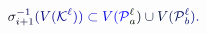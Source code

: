 \documentclass[12pt]{article}
\begin{document}
\makeatletter
\renewcommand*{\@textcolor}[3]{%
  \protect\leavevmode
  \begingroup
    \color#1{#2}#3%
  \endgroup
}
\makeatother
\begin{displaymath}
\mathcolor[RGB]{0,0,15}{\sigma} _ { \mathcolor[RGB]{0,0,30}{i} \mathcolor[RGB]{0,0,45}{+} \mathcolor[RGB]{0,0,60}{1} } ^ { \mathcolor[RGB]{0,0,75}{-} \mathcolor[RGB]{0,0,90}{1} } \mathcolor[RGB]{0,0,105}{(} \mathcolor[RGB]{0,0,120}{V} \mathcolor[RGB]{0,0,135}{(} \mathcal { \mathcolor[RGB]{0,0,150}{K} } ^ { \mathcolor[RGB]{0,0,165}{\ell} } \mathcolor[RGB]{0,0,180}{)} \mathcolor[RGB]{0,0,195}{)} \mathcolor[RGB]{0,0,210}{\subset} \mathcolor[RGB]{0,0,225}{V} \mathcolor[RGB]{0,0,240}{(} \mathcal { \mathcolor[RGB]{0,0,255}{P} } _ { \mathcolor[RGB]{0,15,0}{a} } ^ { \mathcolor[RGB]{0,15,15}{\ell} } \mathcolor[RGB]{0,15,30}{)} \mathcolor[RGB]{0,15,45}{\cup} \mathcolor[RGB]{0,15,60}{V} \mathcolor[RGB]{0,15,75}{(} \mathcal { \mathcolor[RGB]{0,15,90}{P} } _ { \mathcolor[RGB]{0,15,105}{b} } ^ { \mathcolor[RGB]{0,15,120}{\ell} } \mathcolor[RGB]{0,15,135}{)} \mathcolor[RGB]{0,15,150}{.}
\end{displaymath}
\end{document}
